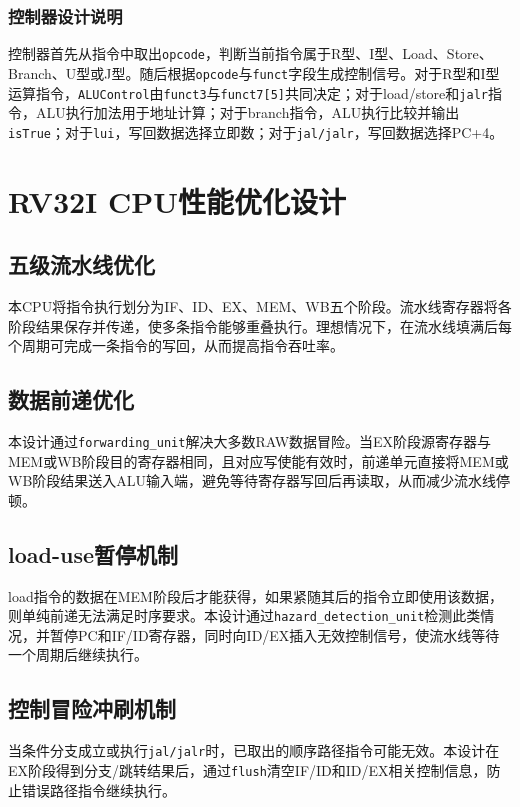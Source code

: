 \documentclass[UTF8,a4paper,12pt]{ctexart}
\newcommand{\code}[1]{\texttt{#1}}
\begin{document}
\subsubsection{控制器设计说明}

控制器首先从指令中取出\code{opcode}，判断当前指令属于R型、I型、Load、Store、Branch、U型或J型。随后根据\code{opcode}与\code{funct}字段生成控制信号。对于R型和I型运算指令，\code{ALUControl}由\code{funct3}与\code{funct7[5]}共同决定；对于load/store和\code{jalr}指令，ALU执行加法用于地址计算；对于branch指令，ALU执行比较并输出\code{isTrue}；对于\code{lui}，写回数据选择立即数；对于\code{jal/jalr}，写回数据选择PC+4。

\section{RV32I CPU性能优化设计}

\subsection{五级流水线优化}

本CPU将指令执行划分为IF、ID、EX、MEM、WB五个阶段。流水线寄存器将各阶段结果保存并传递，使多条指令能够重叠执行。理想情况下，在流水线填满后每个周期可完成一条指令的写回，从而提高指令吞吐率。

\subsection{数据前递优化}

本设计通过\code{forwarding\_unit}解决大多数RAW数据冒险。当EX阶段源寄存器与MEM或WB阶段目的寄存器相同，且对应写使能有效时，前递单元直接将MEM或WB阶段结果送入ALU输入端，避免等待寄存器写回后再读取，从而减少流水线停顿。

\subsection{load-use暂停机制}

load指令的数据在MEM阶段后才能获得，如果紧随其后的指令立即使用该数据，则单纯前递无法满足时序要求。本设计通过\code{hazard\_detection\_unit}检测此类情况，并暂停PC和IF/ID寄存器，同时向ID/EX插入无效控制信号，使流水线等待一个周期后继续执行。

\subsection{控制冒险冲刷机制}

当条件分支成立或执行\code{jal/jalr}时，已取出的顺序路径指令可能无效。本设计在EX阶段得到分支/跳转结果后，通过\code{flush}清空IF/ID和ID/EX相关控制信息，防止错误路径指令继续执行。
\end{document}
